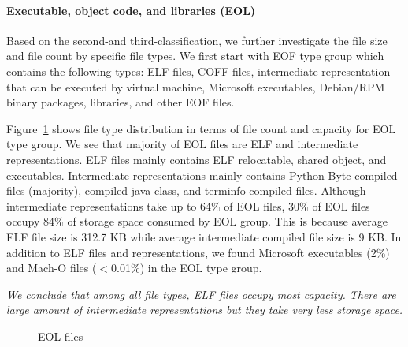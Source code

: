 
\paragraph{Executable, object code, and libraries (EOL)}
Based on the second-and third-classification, we further investigate the file size and file count by specific file types. We first start with EOF type group which contains the following types: ELF files, COFF files, intermediate representation that can be executed by virtual machine, Microsoft executables, Debian/RPM binary packages, libraries, and other EOF files.

Figure~\ref{fig:type-eof} shows file type distribution in terms of file count and capacity for EOL type group. 
We see that majority of EOL files are ELF and intermediate representations. ELF files mainly contains ELF relocatable, shared object, and executables. Intermediate representations mainly contains Python Byte-compiled files (majority), compiled java class, and terminfo compiled files. Although intermediate representations take up to 64\% of EOL files, 30\% of EOL files occupy 84\% of storage space consumed by EOL group. 
This is because average ELF file size is 312.7 KB while average intermediate compiled file size is 9 KB. In addition to ELF files and representations, we found Microsoft executables (2\%) and Mach-O files ($<$0.01\%) in the EOL type group.

\textit{We conclude that among all file types, ELF files occupy most capacity. There are large amount of intermediate representations but they take very less storage space.}

\begin{figure}
	\centering
	\caption{EOL files}
	\label{fig:type-eof}
\end{figure}

